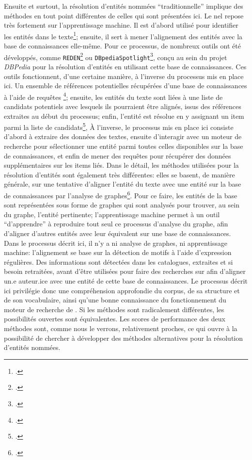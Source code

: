 Ensuite et surtout, la résolution d'entités nommées \enquote{traditionnelle} implique des méthodes en tout point différentes de celles qui sont présentées ici. Le \gls{nel} repose très fortement sur l'apprentissage machine. Il est d'abord utilisé pour identifier les entités dans le texte\footcite[p. 32]{brando_evaluation_2016}; ensuite, il sert à mener l'alignement des entités avec la base de connaissances elle-même. Pour ce processus, de nombreux outils ont été développés, comme \texttt{REDEN}\footcite{brando_reden_2016} ou \texttt{DBpediaSpotlight}\footcite{mendes_dbpedia_2011}, conçu au sein du projet \textit{DBPedia} pour la résolution d'entités en utilisant cette base de connaissances. Ces outils fonctionnent, d'une certaine manière, à l'inverse du processus mis en place ici. Un ensemble de références potentielles récupérées d'une base de connaissances à l'aide de requêtes \sparql{}\footcite[p. 35]{brando_evaluation_2016}; ensuite, les entités du texte sont liées à une liste de candidats potentiels avec lesquels ils pourraient être alignés, issus des références extraites au début du processus; enfin, l'entité est résolue en y assignant un item parmi la liste de candidats\footcite[p. 33]{brando_evaluation_2016}, À l'inverse, le processus mis en place ici consiste d'abord à extraire des données des textes, ensuite d'interagir avec un moteur de recherche pour sélectionner une entité parmi toutes celles disponibles sur la base de connaissances, et enfin de mener des requêtes \sparql{} pour récupérer des données supplémentaires sur les items liés. Dans le détail, les méthodes utilisées pour la résolution d'entités sont également très différentes: elles se basent, de manière générale, sur une tentative d'aligner l'entité du texte avec une entité sur la base de connaissances par l'analyse de graphes\footcite[p. 63]{brando_reden_2016}. Pour ce faire, les entités de la base sont représentées sous forme de graphes qui sont analysés pour trouver, au sein du graphe, l'entité pertinente; l'apprentissage machine permet à un outil \enquote{d'apprendre} à reproduire tout seul ce processus d'analyse du graphe, afin d'aligner d'autres entités avec leur équivalent sur une base de connaissances. Dans le processus décrit ici, il n'y a ni analyse de graphes, ni apprentissage machine: l'alignement se base sur la détection de motifs à l'aide d'\glspl{expression régulière}. Des informations sont détectées dans les catalogues, extraites et si besoin retraitées, avant d'être utilisées pour faire des recherches sur \wkd{} afin d'aligner un.e auteur.ice avec une entité de cette base de connaissances. Le processus décrit ici privilégie donc une compréhension approfondie du corpus, de sa structure et de son vocabulaire, ainsi qu'une bonne connaissance du fonctionnement du moteur de recherche de \wkd{}. Si les méthodes sont radicalement différentes, les possibilités ouvertes sont équivalentes. Les scores de performance des deux méthodes sont, comme nous le verrons, relativement proches, ce qui ouvre à la possibilité de chercher à développer des méthodes alternatives pour la résolution d'entités nommées.

